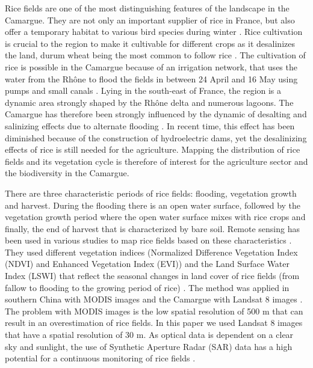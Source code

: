 \documentclass[a4paper, 10pt, conference]{ieeeconf}      %
\begin{document}
Rice fields are one of the most distinguishing features of the landscape in the Camargue. They are not only an important supplier of rice in France, but also offer a temporary habitat to various bird species during winter \cite{Pernollet2015ARegimes}. Rice cultivation is crucial to the region to make it cultivable for different crops as it desalinizes the land, durum wheat being the most common to follow rice \cite{Mouret2004AnFrance,Bazzi2019MappingFrance}. The cultivation of rice is possible in the Camargue because of an irrigation network, that uses the water from the Rhône to flood the fields in between 24 April and 16 May \cite{Ndikumana2018EstimationFrance} using pumps and small canals \cite{Grillas1990DistributionFactors, Pernollet2015ARegimes}. Lying in the south-east of France, the region is a dynamic area strongly shaped by the Rhône delta and numerous lagoons. The Camargue has therefore been strongly influenced by the dynamic of desalting and salinizing effects due to alternate flooding \cite{PerennouLaPerspectives, Grillas1990DistributionFactors}. In recent time, this effect has been diminished because of the construction of hydroelectric dams, yet the desalinizing effects of rice is still needed for the agriculture. Mapping the distribution of rice fields and its vegetation cycle is therefore of interest for the agriculture sector and the biodiversity in the Camargue.

There are three characteristic periods of rice fields: flooding, vegetation growth and harvest. During the flooding there is an open water surface, followed by the vegetation growth period where the open water surface mixes with rice crops and finally, the end of harvest that is characterized by bare soil. Remote sensing has been used in various studies to map rice fields based on these characteristics \cite{Xiao2005MappingImages, Li2018MappingOLI, Perennou2018MappingMap, Bazzi2019MappingFrance}. They used different vegetation indices (Normalized Difference Vegetation Index (NDVI) and Enhanced Vegetation Index (EVI)) and the Land Surface Water Index (LSWI) that reflect the seasonal changes in land cover of rice fields (from fallow to flooding to the growing period of rice) \cite{Li2018MappingOLI, Xiao2005MappingImages}. The method was applied in southern China with MODIS images \cite{Xiao2005MappingImages} and the Camargue with Landsat 8 images \cite{Li2018MappingOLI}. The problem with MODIS images is the low spatial resolution of 500 m that can result in an overestimation of rice fields. In this paper we used Landsat 8 images that have a spatial resolution of 30 m. As optical data is dependent on a clear sky and sunlight, the use of Synthetic Aperture Radar (SAR) data has a high potential for a continuous monitoring of rice fields \cite{Bazzi2019MappingFrance}. 
\end{document}
